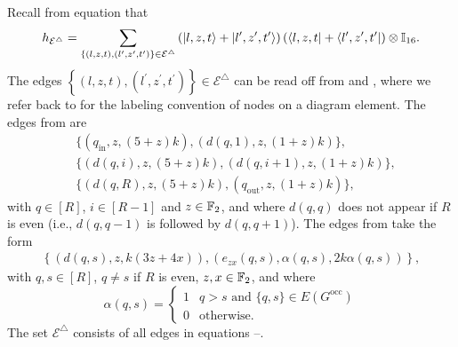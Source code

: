 \documentclass[../thesis-main/thesis-main]{subfiles}
\begin{document}
Recall from equation  that
\begin{align}
  h_{\mathcal{E}^{\triangle}}=\sum_{\left\{ (l,z,t),(l^{\prime},z^{\prime},t^{\prime})\right\} \in\mathcal{E}^{\triangle}}\left(|l,z,t\rangle+|l^{\prime},z^{\prime},t^{\prime}\rangle\right)\left(\langle l,z,t|+\langle l^{\prime},z^{\prime},t^{\prime}|\right)\otimes\mathbb{I}_{16}.\label{eq:equation_for_h_epsilon_triangle}
\end{align}
The edges $\left\{ (l,z,t),(l^{\prime},z^{\prime},t^{\prime})\right\} \in\mathcal{E}^{\triangle}$ can be read off from  and ,  where we refer back to  for the labeling convention of nodes on a diagram element. The edges from  are
\begin{align}
  &\big\{ (q_{\mathrm{in}},z,(5+z)k),(d(q,1),z,(1+z)k)\big\}, \label{eq:epsilon_triangle_set1_1}\\
  &\big\{ (d(q,i),z,(5+z)k),(d(q,i+1),z,(1+z)k)\big\}, \label{eq:epsilon_triangle_set1_2}\\
  & \big\{ (d(q,R),z,(5+z)k),(q_{\mathrm{out}},z,(1+z)k)\big\}, \label{eq:epsilon_triangle_set1_3}
\end{align}
with $q\in[R]$, $i\in [R-1]$ and $z\in \mathbb{F}_2$, and where $d(q,q)$ does not appear if $R$ is even (i.e., $d(q,q-1)$ is followed by $d(q,q+1)$). The edges from  take the form  
\begin{align}
  \left\{ \left(d(q,s),z,k(3z + 4 x) \right),(e_{zx}(q,s),\alpha(q,s),2 k \alpha(q,s))\right\}, \label{eq:epsilon_triangle_set2}
\end{align}
with $q,s\in[R]$, $q\neq s$ if $R$ is even, $z,x\in \mathbb{F}_2$, 
and where
\begin{equation}
  \alpha(q,s)=\begin{cases}
      1 & q>s \text{ and } \{q,s\}\in E(G^{\text{occ}})\\
      0 & \text{otherwise}.
    \end{cases}
\end{equation}
The set $\mathcal{E}^{\triangle}$ consists of all edges in equations --.
\end{document}
